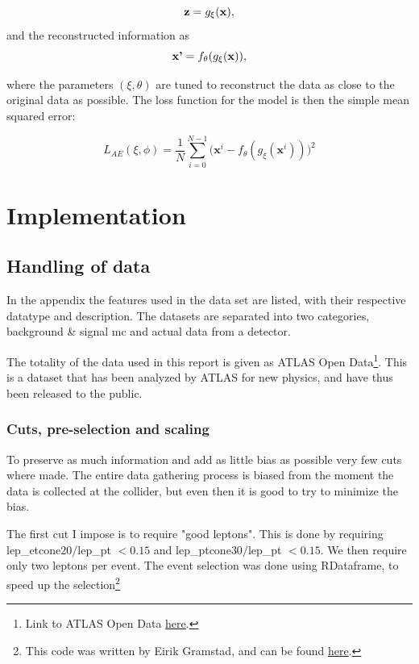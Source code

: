 \documentclass[ reprint, amsmath,amssymb, aps, nofootinbib]{revtex4-2}
\begin{document}
\begin{equation*}
    \textbf{z} = g_{\xi}(\bf{x}),
\end{equation*}
and the reconstructed information as 
\begin{equation*}
    \textbf{x'} = f_{\theta}(g_{\xi}(\bf{x})),
\end{equation*}

where the parameters $(\xi, \theta)$ are tuned to reconstruct the data as close to the original data as possible. The loss function for the model is then the simple mean squared error:

\begin{equation*}
    L_{AE}(\xi, \phi)= \frac{1}{N} \sum_{i=0}^{N-1}\bigg( \textbf{x}^i - f_{\theta}(g_{\xi}(\textbf{x}^i))\bigg)^2
\end{equation*}



\section{Implementation}

\subsection{Handling of data}


In the appendix the features used in the data set are listed, with their respective datatype and description. The datasets are separated into two categories, background \& signal mc and actual data from a detector. 

The totality of the data used in this report is given as ATLAS Open Data\footnote{Link to ATLAS Open Data \href{https://atlas.cern/resources/opendata}{here}.}. This is a dataset that has been analyzed by ATLAS for new physics, and have thus been released to the public. 

\subsubsection{Cuts, pre-selection and scaling}
To preserve as much information and add as little bias as possible very few cuts where made. The entire data gathering process is biased from the moment the data is collected at the collider, but even then it is good to try to minimize the bias. \par

The first cut I impose is to require "good leptons". This is done by requiring lep\_etcone$20/$lep\_pt $< 0.15$ and lep\_ptcone$30/$lep\_pt $< 0.15$. We then require only two leptons per event. The event selection was done using RDataframe\cite{rene_al._2019}, to speed up the selection\footnote{This code was written by Eirik Gramstad, and can be found \href{https://github.uio.no/zpath/software/blob/eirik-dev/Notebooks/ATLASOpenData/13TeV/RDataFrameToDF.ipynb}{here}.}\par 
\end{document}
